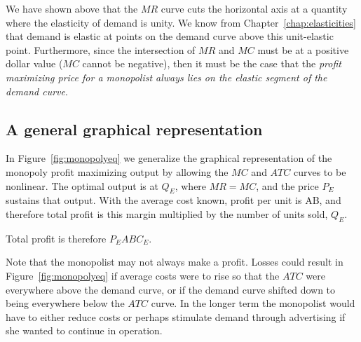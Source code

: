 We have shown above that the $MR$ curve cuts the horizontal axis at a
quantity where the elasticity of demand is unity. We know from Chapter~\ref{chap:elasticities}
that demand is elastic at points on the demand curve
above this unit-elastic point. Furthermore, since the intersection of $MR$
and $MC$ must be at a positive dollar value ($MC$ cannot be negative), then
it must be the case that the \textit{profit maximizing price for a
monopolist always lies on the elastic segment of the demand curve}.
	
\newhtmlpage

\subsection*{A general graphical representation}

In Figure~\ref{fig:monopolyeq} we generalize the graphical representation of
the monopoly profit maximizing output by allowing the $MC$ and $ATC$ curves
to be nonlinear. The optimal output is at $Q_{E}$, where $MR=MC$, and the
price $P_{E}$ sustains that output. With the average cost known, profit per
unit is AB, and therefore total profit is this margin multiplied by the
number of units sold, $Q_{E}$.

Total profit is therefore $P_{E}ABC_{E}.$

Note that the monopolist may not always make a profit. Losses could result
in Figure~\ref{fig:monopolyeq} if average costs were to rise so that the $ATC$
were everywhere above the demand curve, or if the demand curve shifted down to
being everywhere below the $ATC$ curve. In
the longer term the monopolist would have to either reduce costs or perhaps
stimulate demand through advertising if she wanted to continue in operation.

